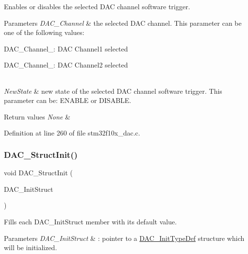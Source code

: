 Enables or disables the selected D\+AC channel software trigger. 


\begin{DoxyParams}{Parameters}
{\em D\+A\+C\+\_\+\+Channel} & the selected D\+AC channel. This parameter can be one of the following values\+: \begin{DoxyItemize}
\item D\+A\+C\+\_\+\+Channel\+\_\+: D\+AC Channel1 selected \item D\+A\+C\+\_\+\+Channel\+\_\+: D\+AC Channel2 selected \end{DoxyItemize}
\\
\hline
{\em New\+State} & new state of the selected D\+AC channel software trigger. This parameter can be\+: E\+N\+A\+B\+LE or D\+I\+S\+A\+B\+LE. \\
\hline
\end{DoxyParams}

\begin{DoxyRetVals}{Return values}
{\em None} & \\
\hline
\end{DoxyRetVals}


Definition at line 260 of file stm32f10x\+\_\+dac.\+c.

\mbox{\label{group___d_a_c___exported___functions_gadfc270974d54cb5fa5f92556015c4046}} 
\subsubsection{\texorpdfstring{D\+A\+C\+\_\+\+Struct\+Init()}{DAC\_StructInit()}}
{\footnotesize\ttfamily void D\+A\+C\+\_\+\+Struct\+Init (\begin{DoxyParamCaption}\item[{\hyperlink{struct_d_a_c___init_type_def}{D\+A\+C\+\_\+\+Init\+Type\+Def} $\ast$}]{D\+A\+C\+\_\+\+Init\+Struct }\end{DoxyParamCaption})}



Fills each D\+A\+C\+\_\+\+Init\+Struct member with its default value. 


\begin{DoxyParams}{Parameters}
{\em D\+A\+C\+\_\+\+Init\+Struct} & \+: pointer to a \hyperlink{struct_d_a_c___init_type_def}{D\+A\+C\+\_\+\+Init\+Type\+Def} structure which will be initialized. \\
\hline
\end{DoxyParams}

